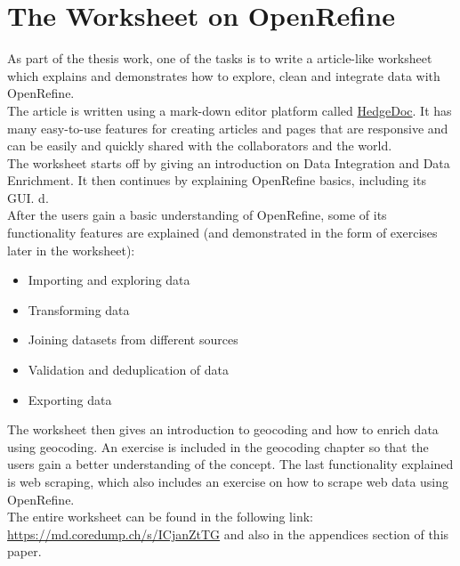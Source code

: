\chapter{The Worksheet on OpenRefine}
As part of the thesis work, one of the tasks is to write a article-like worksheet which explains and demonstrates how to explore, clean and integrate data with OpenRefine.\\
\newline
The article is written using a mark-down editor platform called \href{https://md.coredump.ch/}{HedgeDoc}. It has many easy-to-use features for creating articles and pages that are responsive and can be easily and quickly shared with the collaborators and the world.\\
\newline
The worksheet starts off by giving an introduction on Data Integration and Data Enrichment. It then continues by explaining OpenRefine basics, including it\textquotesingle s GUI. d. \\
\newline
After the users gain a basic understanding of OpenRefine, some of its functionality features are explained (and demonstrated in the form of exercises later in the worksheet):
\begin{itemize}
	\item Importing and exploring data
	\item Transforming data
	\item Joining datasets from different sources
	\item Validation and deduplication of data
	\item Exporting data
\end{itemize}
The worksheet then gives an introduction to geocoding and how to enrich data using geocoding. An exercise is included in the geocoding chapter so that the users gain a better understanding of the concept. The last functionality explained is web scraping, which also includes an exercise on how to scrape web data using OpenRefine.\\
\newline
The entire worksheet can be found in the following link: \href{https://md.coredump.ch/s/ICjanZtTG}{https://md.coredump.ch/s/ICjanZtTG} and also in the appendices section of this paper.